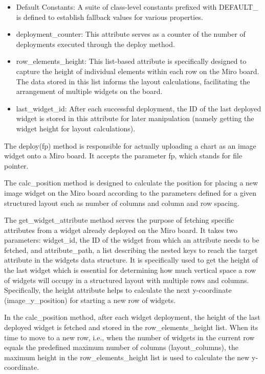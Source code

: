 \begin{itemize}
\item
  Default Constants: A suite of class-level constants prefixed with
  DEFAULT\_ is defined to establish fallback values for various
  properties.
\item
  deployment\_counter: This attribute serves as a counter of the number
  of deployments executed through the deploy method.
\item
  row\_elements\_height: This list-based attribute is specifically
  designed to capture the height of individual elements within each row
  on the Miro board. The data stored in this list informs the layout
  calculations, facilitating the arrangement of multiple widgets on the
  board.
\item
  last\_widget\_id: After each successful deployment, the ID of the last
  deployed widget is stored in this attribute for later manipulation
  (namely getting the widget height for layout calculations).
\end{itemize}

The deploy(fp) method is responsible for actually uploading a chart as
an image widget onto a Miro board. It accepts the parameter fp, which
stands for file pointer.

The calc\_position method is designed to calculate the position for
placing a new image widget on the Miro board according to the parameters
defined for a given structured layout such as number of columns and
column and row spacing.

The get\_widget\_attribute method serves the purpose of fetching
specific attributes from a widget already deployed on the Miro board. It
takes two parameters: widget\_id, the ID of the widget from which an
attribute needs to be fetched, and attribute\_path, a list describing
the nested keys to reach the target attribute in the
widget\textquotesingle s data structure. It is specifically used to get
the height of the last widget which is essential for determining how
much vertical space a row of widgets will occupy in a structured layout
with multiple rows and columns. Specifically, the height attribute helps
to calculate the next y-coordinate (image\_y\_position) for starting a
new row of widgets.

In the calc\_position method, after each widget deployment, the height
of the last deployed widget is fetched and stored in the
row\_elements\_height list. When it\textquotesingle s time to move to a
new row, i.e., when the number of widgets in the current row equals the
predefined maximum number of columns (layout\_columns), the maximum
height in the row\_elements\_height list is used to calculate the new
y-coordinate.
